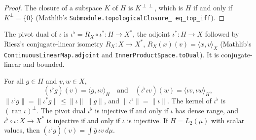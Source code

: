 \begin{proof}
\leanok
The closure of a subspace $K$ of $H$ is $K^{\perp\perp}$, which is $H$ if and only if
$K^\perp = \{0\}$ (Mathlib's \texttt{Submodule.\allowbreak topologicalClosure\_\allowbreak
eq\_\allowbreak top\_\allowbreak iff}).
\end{proof}

\begin{definition}
\label{def:pivot-dual}
\leanok
The pivot dual of $\iota$ is $\iota^\flat = R_X \circ \iota^* : H \to X^*$, the adjoint
$\iota^* : H \to X$ followed by Riesz's conjugate-linear isometry $R_X : X \to X^*$,
$R_X(x)(v) = \langle x, v \rangle_X$ (Mathlib's \texttt{ContinuousLinearMap.\allowbreak adjoint}
and \texttt{InnerProductSpace.\allowbreak toDual}). It is conjugate-linear and bounded.
\end{definition}

\begin{theorem}
\label{thm:pivot-dual}
\leanok
{}
For all $g \in H$ and $v, w \in X$,
\[
  (\iota^\flat g)(v) = \langle g, \iota v \rangle_H \quad\text{and}\quad
  (\iota^\flat \iota v)(w) = \langle \iota v, \iota w \rangle_H ,
\]
$\|\iota^\flat g\| = \|\iota^* g\| \leq \|\iota\| \, \|g\|$, and $\|\iota^\flat\| = \|\iota\|$. The
kernel of $\iota^\flat$ is $(\operatorname{ran} \iota)^\perp$. The pivot dual $\iota^\flat$ is
injective if and only if $\iota$ has dense range, and $\iota^\flat \circ \iota : X \to X^*$ is
injective if and only if $\iota$ is injective. If $H = L_2(\mu)$ with scalar values, then
$(\iota^\flat g)(v) = \int \overline{g} \, \iota v \, d\mu$.
\end{theorem}

